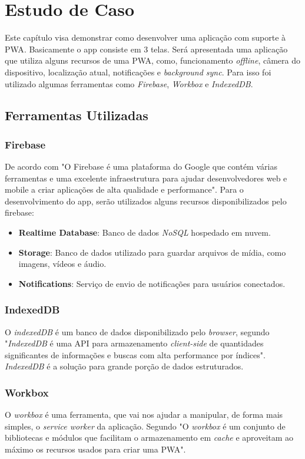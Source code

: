 \chapter{\textbf{Estudo de Caso}}
Este capítulo visa demonstrar como desenvolver uma aplicação com suporte à \ac{PWA}. Basicamente o app consiste em 3 telas. Será apresentada uma aplicação que utiliza alguns recursos de uma \ac{PWA}, como, funcionamento \textit{offline}, câmera do dispositivo, localização atual, notificações e \textit{background sync}. Para isso foi utilizado algumas ferramentas como \textit{Firebase}, \textit{Workbox} e \textit{IndexedDB}.

\section{Ferramentas Utilizadas}
\subsection{Firebase}
De acordo com \cite{firebase} "O Firebase é uma plataforma do Google que contém várias ferramentas e uma excelente infraestrutura para ajudar desenvolvedores web e mobile a criar aplicações de alta qualidade e performance". Para o desenvolvimento do app, serão utilizados alguns recursos disponibilizados pelo firebase:

\begin{itemize}
	\item \textbf{Realtime Database}: Banco de dados \textit{NoSQL} hospedado em nuvem.
	\item \textbf{Storage}: Banco de dados utilizado para guardar arquivos de mídia, como imagens, vídeos e áudio.
	\item \textbf{Notifications}: Serviço de envio de notificações para usuários conectados.
\end{itemize}

\subsection{IndexedDB}
O \textit{indexedDB} é um banco de dados disponibilizado pelo \textit{browser}, segundo \cite{indexdb} "\textit{IndexedDB} é uma \ac{API} para armazenamento \textit{client-side} de quantidades significantes de informações e buscas com alta performance por índices". \textit{IndexedDB} é a solução para grande porção de dados estruturados.

\subsection{Workbox}
O \textit{workbox} é uma ferramenta, que vai nos ajudar a manipular, de forma mais simples, o \textit{service worker} da aplicação. Segundo \cite{workbox} "O \textit{workbox} é um conjunto de bibliotecas e módulos que facilitam o armazenamento em \textit{cache} e aproveitam ao máximo os recursos usados para criar uma \ac{PWA}".

